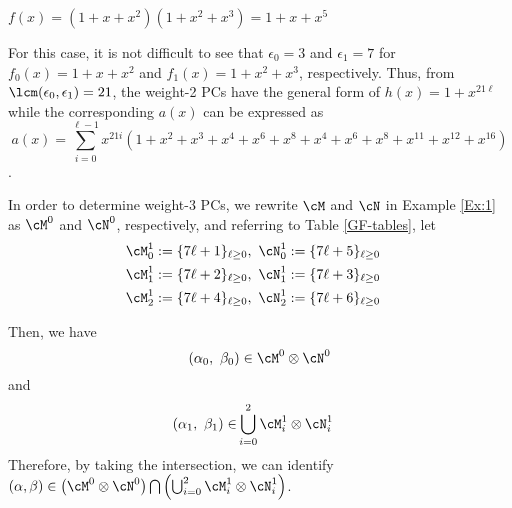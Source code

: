 \begin{example}
$f(x)=(1+x+x^2)(1+x^2+x^3)=1+x+x^5$

For this case, it is not difficult to see that $\epsilon_0=3$ and $\epsilon_1=7$ for $f_0(x)=1+x+x^2$ and $f_1(x)=1+x^2+x^3$, respectively. Thus, from $\lcm(\epsilon_0,\epsilon_1)=21$, the weight-2 PCs have the general form of $h(x)=1+x^{21\ell}$ while the corresponding $a(x)$ can be expressed as $$a(x)=\sum_{i=0}^{\ell-1} x^{21i}(1+x^2+x^3+x^4+x^6+x^8+x^{4}+x^{6}+x^{8}+x^{11}+x^{12}+x^{16})$$.


In order to determine weight-3 PCs, we rewrite $\cM$ and $\cN$ in Example \ref{Ex:1} as $\cM^0$ and $\cN^0$, respectively,
and referring to Table \ref{GF-tables}, let
\begin{align}
	\cM_0^1 &:= \{7\ell + 1\}_{\ell \geq 0},~\cN_0^1 := \{7\ell + 5\}_{\ell \geq 0}\cr
	\cM_1^1 &:= \{7\ell + 2\}_{\ell \geq 0},~\cN_1^1 := \{7\ell + 3\}_{\ell \geq 0}\cr
	\cM_2^1 &:= \{7\ell + 4\}_{\ell \geq 0},~\cN_2^1 := \{7\ell + 6\}_{\ell \geq 0}
\end{align}

Then, we have
\[
(\alpha_0,~\beta_0) \in \cM^0\otimes\cN^0 
\]
and
\begin{equation*}
\begin{split}
(\alpha_1,~\beta_1) \in &\bigcup_{i=0}^2 \cM_i^1\otimes\cN_i^1 
\end{split}
\end{equation*}
Therefore, by taking the intersection, we can identify $(\alpha,\beta) \in \left(\cM^0\otimes\cN^0\right)\bigcap\left(\bigcup_{i=0}^2 \cM_i^1\otimes\cN_i^1 \right) $.
\label{Ex:6}
\end{example}

